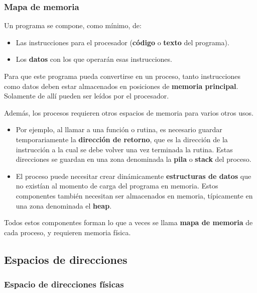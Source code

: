 \documentclass[spanish,a4paper,]{article}
\providecommand{\tightlist}{%
  \setlength{\itemsep}{0pt}\setlength{\parskip}{0pt}}
\begin{document}
\hypertarget{mapa-de-memoria}{%
\subsubsection{Mapa de memoria}\label{mapa-de-memoria}}

Un programa se compone, como mínimo, de:

\begin{itemize}
\tightlist
\item
  Las instrucciones para el procesador (\textbf{código} o \textbf{texto}
  del programa).
\item
  Los \textbf{datos} con los que operarán esas instrucciones.
\end{itemize}

Para que este programa pueda convertirse en un proceso, tanto
instrucciones como datos deben estar almacenados en posiciones de
\textbf{memoria principal}. Solamente de allí pueden ser leídos por el
procesador.

Además, los procesos requieren otros espacios de memoria para varios
otros usos.

\begin{itemize}
\tightlist
\item
  Por ejemplo, al llamar a una función o rutina, es necesario guardar
  temporariamente la \textbf{dirección de retorno}, que es la dirección
  de la instrucción a la cual se debe volver una vez terminada la
  rutina. Estas direcciones se guardan en una zona denominada la
  \textbf{pila} o \textbf{stack} del proceso.
\item
  El proceso puede necesitar crear dinámicamente \textbf{estructuras de
  datos} que no existían al momento de carga del programa en memoria.
  Estos componentes también necesitan ser almacenados en memoria,
  típicamente en una zona denominada el \textbf{heap}.
\end{itemize}

Todos estos componentes forman lo que a veces se llama \textbf{mapa de
memoria} de cada proceso, y requieren memoria física.

\hypertarget{espacios-de-direcciones}{%
\subsection{Espacios de direcciones}\label{espacios-de-direcciones}}

\hypertarget{espacio-de-direcciones-fuxedsicas}{%
\subsubsection{Espacio de direcciones
físicas}\label{espacio-de-direcciones-fuxedsicas}}
\end{document}
